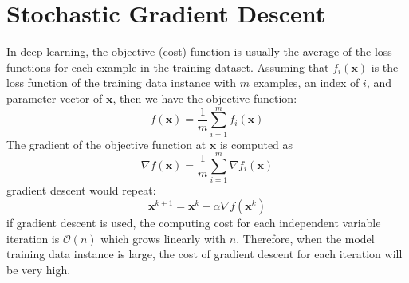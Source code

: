 \documentclass[12pt]{report}
\numberwithin{equation}{section}
\begin{document}
\section{Stochastic Gradient Descent}\label{sec:sgd}
In deep learning, the objective (cost) function is usually the average of the loss functions for each example in the training dataset. Assuming that $f_i(\bm{x})$ is the loss function of the training data instance with $m$ examples, an index of $i$, and parameter vector of $\bm{x}$, then we have the objective function:
\begin{equation}\label{eqn:sgd_obj}
f(\bm{x}) = \frac{1}{m}\sum_{i=1}^m f_i(\bm{x})
\end{equation}
The gradient of the objective function at $\bm{x}$ is computed as
\[
\nabla f(\bm{x})=\frac{1}{m} \sum_{i=1}^{m} \nabla f_{i}(\bm{x})
\]
gradient descent would repeat:
\[
\bm{x}^{k+1} = \bm{x}^k - \alpha \nabla f(\bm{x}^k)
\]
if gradient descent is used, the computing cost for each independent variable iteration is $\mathcal{O}(n)$ which grows linearly with $n$. Therefore, when the model training data instance is large, the cost of gradient descent for each iteration will be very high.
\end{document}
